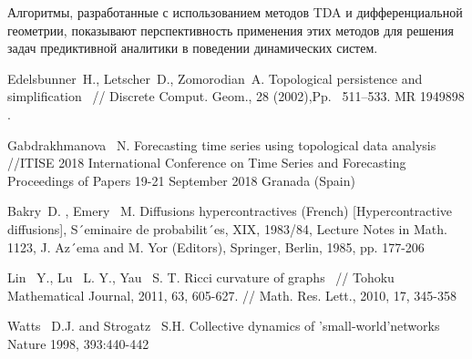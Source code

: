  Алгоритмы, разработанные с использованием методов TDA и дифференциальной геометрии, показывают перспективность применения этих методов для решения задач предиктивной аналитики в поведении динамических систем.



  \centering
  


%

\begin{thebibliography}{9} %
 Edelsbunner~H., Letscher~D., Zomorodian~A. Topological persistence and simplification ~// Discrete Comput. Geom., 28 (2002),Pp.~ 511–533. MR 1949898 .


 Gabdrakhmanova~ N.  Forecasting time series using topological data analysis~ //ITISE 2018 International Conference on Time Series and Forecasting Proceedings of Papers 19-21 September 2018 Granada (Spain) 

 Bakry~D. , Emery~ M.  Diffusions hypercontractives (French) [Hypercontractive diffusions], S´eminaire de probabilit´es, XIX, 1983/84, Lecture Notes in Math. 1123, J. Az´ema and M. Yor (Editors), Springer, Berlin, 1985, pp. 177-206

 Lin~ Y., Lu~ L. Y., Yau~ S. T. Ricci curvature of graphs ~// Tohoku Mathematical Journal, 2011, 63, 605-627. // Math. Res. Lett., 2010, 17, 345-358

 Watts ~D.J. and Strogatz~ S.H. Collective dynamics of 'small-world'networks Nature 1998, 393:440-442 



\end{thebibliography}




%

